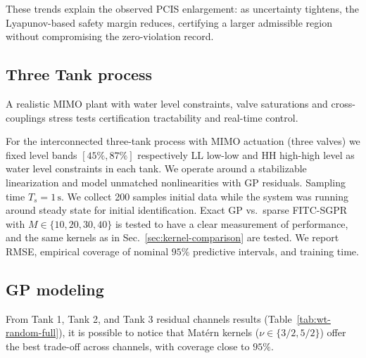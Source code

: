 \documentclass[10pt]{article}
\newcommand{\1}{\mathbbm{1}}
\begin{document}
These trends explain the observed PCIS enlargement: as uncertainty tightens, the Lyapunov-based safety margin reduces, certifying a larger admissible region without compromising the zero-violation record.

\subsection{Three Tank process}\label{sec:results:tank}
A realistic MIMO plant with water level constraints, valve saturations and cross-couplings stress tests certification tractability and real-time control.

For the interconnected three-tank process with MIMO actuation (three valves) we fixed level bands \([45\%,87\%]\) respectively LL low-low and HH high-high level as water level constraints in each tank. We operate around a stabilizable linearization and model unmatched nonlinearities with GP residuals. Sampling time \(T_s = 1\,\mathrm{s}\). We collect 200 samples initial data while the system was running around steady state for initial identification.
Exact GP vs.\ sparse FITC-SGPR with \(M\in\{10,20,30,40\}\) is tested to have a clear measurement of performance, and the same kernels as in Sec.~\ref{sec:kernel-comparison} are tested.
 We report RMSE, empirical coverage of nominal \(95\%\) predictive intervals, and training time. 

\subsection{GP modeling}\label{subsec:tank_gp}
From Tank 1, Tank 2, and Tank 3 residual channels results (Table~\ref{tab:wt-random-full}), it is possible to notice that Matérn kernels (\(\nu\in\{3/2,5/2\}\)) offer the best trade-off across channels, with coverage close to \(95\%\). 
\end{document}
